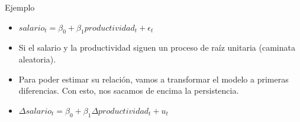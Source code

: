 \documentclass{beamer}
\begin{document}
\begin{frame}{  Ejemplo}

\begin{itemize}
    \item $
  salario_t = \beta_0 + \beta_1 productividad_t + \epsilon_t 
$

\item 
  Si el salario y la  productividad siguen un proceso de raíz unitaria (caminata aleatoria).

  \item Para poder estimar su relación, vamos a transformar el modelo a primeras diferencias.
  Con esto, nos sacamos de encima la persistencia.

  \item $
  \Delta salario_t = \beta_0 + \beta_1 \Delta productividad_t + u_t
$
\end{itemize}

\end{frame}
\end{document}
